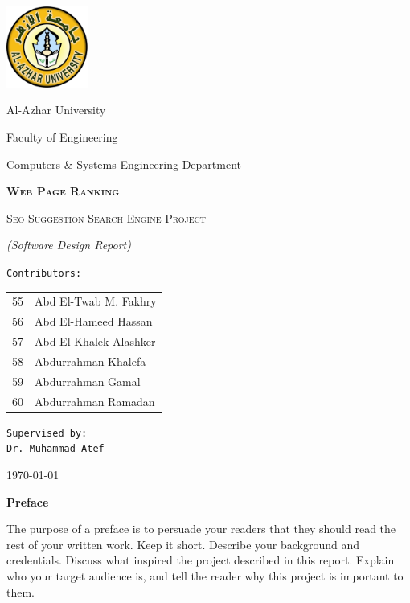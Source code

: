\documentclass{scrartcl}
\newenvironment{preface}{
  \begin{center}
    {\Large \textbf{Preface}}
    \vspace{0.5cm}
    \par
    \begin{minipage}{0.8\linewidth}}{\end{minipage}
    \noindent\ignorespaces
  \end{center}
}
\begin{document}
\begin{titlepage}
	\centering
	\includegraphics[width=0.2\textwidth]{al-azhar.png}\par\vspace{12pt}
	{\LARGE Al-Azhar University \par}\vspace{3pt}
	{\Large Faculty of Engineering \par}
	{\Large Computers \& Systems Engineering Department \par}\vspace{12pt}
	\vfill
	{\huge\bfseries\scshape Web Page Ranking \par}\vspace{8pt}
  {\scshape Seo Suggestion Search Engine Project \par}\vspace{8pt}
  {\itshape (Software Design Report) \par}
	\vfill
	{\Large\texttt{Contributors:} \\[12pt]
    \Large\itshape\ttfamily
    \begin{tabular}{ll}
      55 & Abd El-Twab M. Fakhry \\
      56 & Abd El-Hameed Hassan \\
      57 & Abd El-Khalek Alashker \\
      58 & Abdurrahman Khalefa \\
      59 & Abdurrahman Gamal \\
      60 & Abdurrahman Ramadan \\
    \end{tabular}
  }\par
	\vspace{1cm}
	\vfill
  {\Large\texttt{Supervised by:} \\
	\texttt{Dr. Muhammad Atef} \par}
  \vfill
  {\large \today \par}
\end{titlepage}

\newpage

\begin{preface}
  The purpose of a preface is to persuade your readers that they should read the rest of your written work. Keep it short. Describe your background and credentials. Discuss what inspired the project described in this report. Explain who your target audience is, and tell the reader why this project is important to them.
\end{preface}\vspace{1cm}
\end{document}
